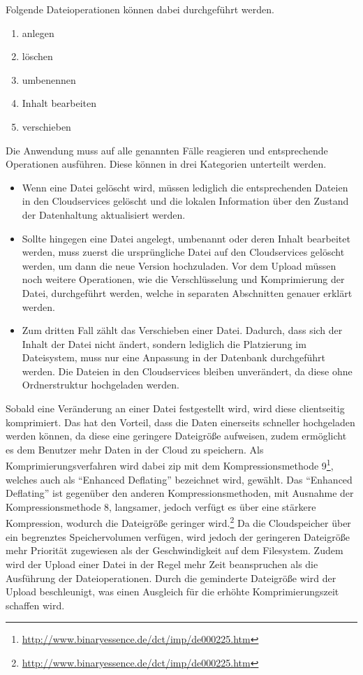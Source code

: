 Folgende Dateioperationen können dabei durchgeführt werden.
\begin{enumerate}
    \item anlegen
    \item löschen
    \item umbenennen
    \item Inhalt bearbeiten
    \item verschieben
\end{enumerate}

Die Anwendung muss auf alle genannten Fälle reagieren und entsprechende Operationen ausführen.
Diese können in drei Kategorien unterteilt werden.

\begin{itemize}
    \item Wenn eine Datei gelöscht wird, müssen lediglich die entsprechenden Dateien in den Cloudservices gelöscht und die lokalen Information über den Zustand der Datenhaltung aktualisiert werden.

    \item Sollte hingegen eine Datei angelegt, umbenannt oder deren Inhalt bearbeitet werden, muss zuerst die ursprüngliche Datei auf den Cloudservices gelöscht werden, um dann die neue Version hochzuladen.
Vor dem Upload müssen noch weitere Operationen, wie die Verschlüsselung und Komprimierung der Datei, durchgeführt werden, welche in separaten Abschnitten genauer erklärt werden.

    \item Zum dritten Fall zählt das Verschieben einer Datei.
    Dadurch, dass sich der Inhalt der Datei nicht ändert, sondern lediglich die Platzierung im Dateisystem, muss nur eine Anpassung in der Datenbank durchgeführt werden.
    Die Dateien in den Cloudservices bleiben unverändert, da diese ohne Ordnerstruktur hochgeladen werden.

\end{itemize}

Sobald eine Veränderung an einer Datei festgestellt wird, wird diese clientseitig komprimiert.
Das hat den Vorteil, dass die Daten einerseits schneller hochgeladen werden können, da diese eine geringere Dateigröße aufweisen, zudem ermöglicht es dem Benutzer mehr Daten in der Cloud zu speichern.
Als Komprimierungsverfahren wird dabei zip mit dem Kompressionsmethode 9\footnote{\url{http://www.binaryessence.de/dct/imp/de000225.htm}}, welches auch als "`Enhanced Deflating"' bezeichnet wird, gewählt.
Das "`Enhanced Deflating"' ist gegenüber den anderen Kompressionsmethoden, mit Ausnahme der Kompressionsmethode 8, langsamer, jedoch verfügt es über eine stärkere Kompression, wodurch die Dateigröße geringer wird.\footnote{\url{http://www.binaryessence.de/dct/imp/de000225.htm}}
Da die Cloudspeicher über ein begrenztes Speichervolumen verfügen, wird jedoch der geringeren Dateigröße mehr Priorität zugewiesen als der Geschwindigkeit auf dem Filesystem.
Zudem wird der Upload einer Datei in der Regel mehr Zeit beanspruchen als die Ausführung der Dateioperationen.
Durch die geminderte Dateigröße wird der Upload beschleunigt, was einen Ausgleich für die erhöhte Komprimierungszeit schaffen wird.

